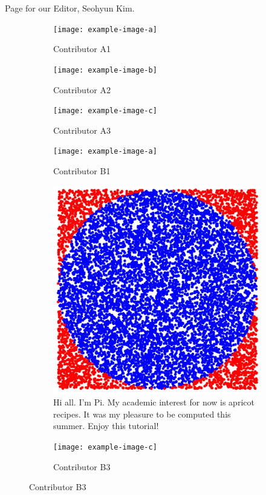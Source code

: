 \documentclass{textbook}
\begin{document}
Page for our Editor, Seohyun Kim.

\begin{figure}[H]
  \centering
    \begin{minipage}{0.9\textwidth} %
  \begin{subfigure}{0.25\textwidth}
    \texttt{[image: example-image-a]}
    \caption{Contributor A1}
  \end{subfigure}
  \hfill
  \begin{subfigure}{0.25\textwidth}
    \texttt{[image: example-image-b]}
    \caption{Contributor A2}
  \end{subfigure}
  \hfill
  \begin{subfigure}{0.25\textwidth}
    \texttt{[image: example-image-c]}
    \caption{Contributor A3}
  \end{subfigure}
  
  \vspace{0.5cm}

  \begin{subfigure}{0.25\textwidth}
    \texttt{[image: example-image-a]}
    \caption{Contributor B1}
  \end{subfigure}
  \hfill
  \begin{subfigure}{0.25\textwidth}
    \includegraphics[width=\textwidth]{resources/textbook_front.png}
    \caption{Hi all. I'm Pi. My academic interest for now is apricot recipes. It was my pleasure to be computed this summer. Enjoy this tutorial!}
  \end{subfigure}
  \hfill
  \begin{subfigure}{0.25\textwidth}
    \texttt{[image: example-image-c]}
    \caption{Contributor B3}
  \end{subfigure}


\end{minipage}
\end{figure}
\end{document}
